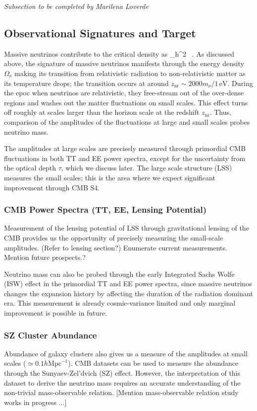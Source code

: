 {\it Subsection to be completed by Marilena Loverde}



\subsection{Observational Signatures and Target}
%
Massive neutrinos contribute to the critical density as
\beq
\Omega_\nu h^2 \simeq {} \ .
\eeq
As discussed above, the signature of massive neutrinos manifests through
the energy density $\Omega_\nu$ making its transition from relativistic
radiation to non-relativistic matter as its temperature drops;
the transition occurs at around $z_\mathrm{nr} \sim
2000m_\nu/1\,\mathrm{eV}$.  During the epoc when
neutrinos are relativistic, they free-stream out of the over-dense regions
and washes out the matter fluctuations on small scales.  This effect
turns off roughly at scales larger than the horizon scale at
the redshift $z_\mathrm{nr}$.  Thus, comparison of the amplitudes of the
fluctuations at large and small
scales probes neutrino mass.

The amplitudes at large scales are precisely measured through
primordial CMB fluctuations in both TT and EE power spectra, except for the
uncertainty from the optical depth $\tau$, which we discuss later.
%
The large scale structure (LSS) measures the small scales; this is the
area where we expect significant improvement through CMB S4.

\subsubsection{CMB Power Spectra (TT, EE, Lensing Potential)}
Measurement of the lensing potential of LSS through gravitational
lensing of the CMB provides us the opportunity of precisely measuring
the small-scale amplitudes.  (Refer to lensing section?)
%
Enumerate current measurements.  Mention future prospects.?

Neutrino mass can also be probed through the early Integrated Sachs
Wolfe (ISW) effect in the primordial TT and EE power spectra, since
massive neutrinos changes the expansion history by affecting the
duration of the radiation dominant era.  This measurement is already
cosmic-variance limited and only marginal improvement is possible in
future.  

\subsubsection{SZ Cluster Abundance}
Abundance of galaxy clusters also gives us a measure of the 
amplitudes at small scales ($\simeq 0.1h\mathrm{Mpc}^{-1}$).
%
CMB datasets can be used to measure the abundance through the
Sunyaev-Zel'dvich (SZ) effect.
%
However, the interpretation of this dataset to derive the neutrino mass
 requires an accurate understanding of 
 the non-trivial mass-observable relation.
[Mention mass-observable relation study works in progress ...]


